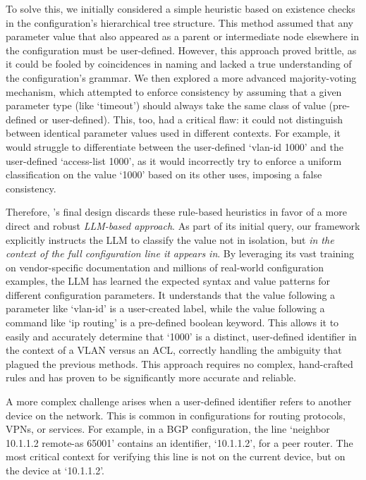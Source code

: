 To solve this, we initially considered a simple heuristic based on existence checks in the configuration's hierarchical tree structure. This method assumed that any parameter value that also appeared as a parent or intermediate node elsewhere in the configuration must be user-defined. However, this approach proved brittle, as it could be fooled by coincidences in naming and lacked a true understanding of the configuration's grammar. We then explored a more advanced majority-voting mechanism, which attempted to enforce consistency by assuming that a given parameter type (like `timeout') should always take the same class of value (pre-defined or user-defined). This, too, had a critical flaw: it could not distinguish between identical parameter values used in different contexts. For example, it would struggle to differentiate between the user-defined `vlan-id 1000' and the user-defined `access-list 1000', as it would incorrectly try to enforce a uniform classification on the value `1000' based on its other uses, imposing a false consistency.


Therefore, \sysname{}'s final design discards these rule-based heuristics in favor of a more direct and robust \textit{LLM-based approach}. As part of its initial query, our framework explicitly instructs the LLM to classify the value not in isolation, but \textit{in the context of the full configuration line it appears in}. By leveraging its vast training on vendor-specific documentation and millions of real-world configuration examples, the LLM has learned the expected syntax and value patterns for different configuration parameters. It understands that the value following a parameter like `vlan-id' is a user-created label, while the value following a command like `ip routing' is a pre-defined boolean keyword. This allows it to easily and accurately determine that `1000' is a distinct, user-defined identifier in the context of a VLAN versus an ACL, correctly handling the ambiguity that plagued the previous methods. This approach requires no complex, hand-crafted rules and has proven to be significantly more accurate and reliable.

A more complex challenge arises when a user-defined identifier refers to another device on the network. This is common in configurations for routing protocols, VPNs, or services. For example, in a BGP configuration, the line `neighbor 10.1.1.2 remote-as 65001' contains an identifier, `10.1.1.2', for a peer router. The most critical context for verifying this line is not on the current device, but on the device at `10.1.1.2'.

